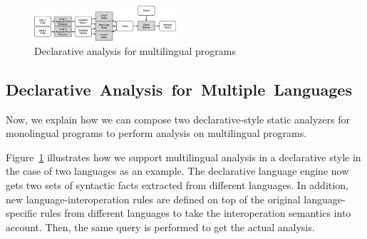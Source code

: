 \begin{figure}[t]
  \centering
  \vspace{2mm}
  \includegraphics[width=0.47\textwidth]{img/ov2.png}
  \caption{Declarative analysis for multilingual programs}
  \label{fig:ov2}
\end{figure}

\subsection{\mbox{Declarative Analysis for Multiple Languages}}
Now, we explain how we can compose two declarative-style static analyzers
for monolingual programs to perform analysis on multilingual programs.

Figure~\ref{fig:ov2} illustrates how we support multilingual
analysis in a declarative style in the case of two languages as an
example. The declarative language engine now gets two sets of
syntactic facts extracted from different languages. In addition,
new language-interoperation rules are defined on top of the original
language-specific rules from different languages to take the
interoperation semantics into account. Then, the same query is performed
to get the actual analysis.

%
